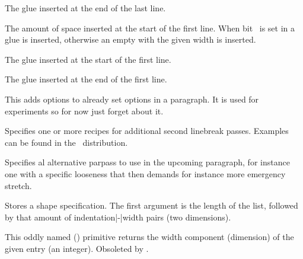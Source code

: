 \startoldprimitive[title={\prm {parfillskip}}]

The glue inserted at the end of the last line.

\stopoldprimitive

\startoldprimitive[title={\prm {parindent}}]

The amount of space inserted at the start of the first line. When bit \tobit
{}\ is set in  a glue is
inserted, otherwise an empty  with the given width is inserted.

\stopoldprimitive

\startnewprimitive[title={\prm {parinitleftskip}}]

The glue inserted at the start of the first line.

\stopnewprimitive

\startnewprimitive[title={\prm {parinitrightskip}}]

The glue inserted at the end of the first line.

\stopnewprimitive

\startnewprimitive[title={\prm {paroptions}}]

This adds options to already set options in a paragraph. It is used for
experiments so for now just forget about it.

\stopnewprimitive

\startnewprimitive[title={\prm {parpasses}}]

Specifies one or more recipes for additional second linebreak passes. Examples
can be found in the \CONTEXT\ distribution.

\stopnewprimitive

\startnewprimitive[title={\prm {parpassesexception}}]

Specifies al alternative parpass to use in the upcoming paragraph, for instance
one with a specific looseness that then demands for instance more emergency
stretch.

\stopnewprimitive

\startoldprimitive[title={\prm {parshape}}]

Stores a shape specification. The first argument is the length of the list,
followed by that amount of indentation|-|width pairs (two dimensions).

\stopoldprimitive

\startoldprimitive[title={\prm {parshapedimen}}]

This oddly named (\ETEX) primitive returns the width component (dimension) of the
given entry (an integer). Obsoleted by .

